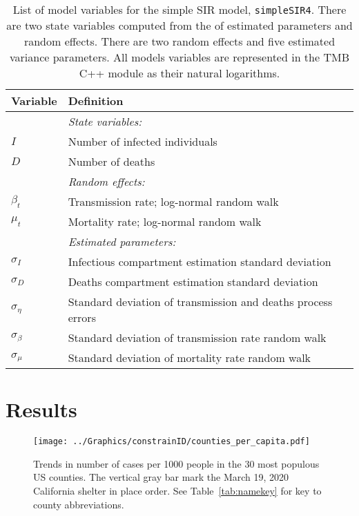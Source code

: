 \documentclass[12pt,letterpaper]{article}
\newcommand\SSm{{\tt simpleSIR4}}
\begin{document}
\begin{table}[!h]
\caption{List of model variables for the simple SIR model, \SSm.
There are two state variables computed from the of estimated
parameters and random effects.
There are two random effects and five estimated variance parameters.
All models variables are represented in the TMB C++ module as their
natural logarithms.
}
\label{tab:allvars1}
\begin{center}
\begin{tabular}{ll}
\hline
Variable & Definition\\
\hline
\hline
       & {\it State variables:}\\
$I$      & Number of infected individuals\\
$D$      & Number of deaths\\
       & {\it Random effects:}\\
$\beta_t$ & Transmission rate; log-normal random walk\\
$\mu_t$   & Mortality rate; log-normal random walk\\
       & {\it Estimated parameters:}\\
$\sigma_I$ & Infectious compartment estimation standard deviation\\
$\sigma_D$ & Deaths compartment estimation standard deviation\\
$\sigma_\eta$ & Standard deviation of transmission and deaths process errors\\
$\sigma_\beta$ & Standard deviation of transmission rate random walk\\
$\sigma_\mu$ & Standard deviation of mortality rate random walk\\
\hline
\end{tabular}
\end{center}
\end{table}

\clearpage
\section*{Results}

\begin{figure}[h!]
\begin{center}
\texttt{[image: ../Graphics/constrainID/counties\_per\_capita.pdf]}
\end{center}
\caption{\label{fig:percap}
Trends in number of cases per 1000 people in the 30 most populous US
counties.
The vertical gray bar mark the March 19, 2020 California shelter in place order.
See Table~\ref{tab:namekey} for key to county abbreviations.
}
\end{figure}
\end{document}
